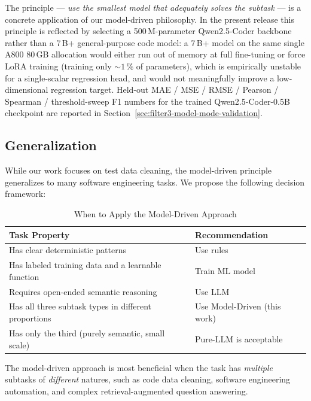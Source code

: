 \documentclass[acmlarge,nonacm,screen]{acmart}
\begin{document}
The principle --- \textit{use the smallest model that adequately
solves the subtask} --- is a concrete application of our
model-driven philosophy. In the present release this principle is
reflected by selecting a 500\,M-parameter Qwen2.5-Coder backbone
rather than a 7\,B+ general-purpose code model: a 7\,B+ model on
the same single A800 80\,GB allocation would either run out of
memory at full fine-tuning or force LoRA training (training only
$\sim 1\,\%$ of parameters), which is empirically unstable for a
single-scalar regression head, and would not meaningfully improve
a low-dimensional regression target. Held-out MAE / MSE / RMSE /
Pearson / Spearman / threshold-sweep F1 numbers for the trained
Qwen2.5-Coder-0.5B checkpoint are reported in
Section~\ref{sec:filter3-model-mode-validation}.

\subsection{Generalization}

While our work focuses on test data cleaning, the model-driven principle generalizes to many software engineering tasks. We propose the following decision framework:

\begin{table}[htbp]
\caption{When to Apply the Model-Driven Approach}
\label{tab:when-md}
\begin{tabular}{@{}p{8cm}l@{}}
\toprule
\textbf{Task Property} & \textbf{Recommendation} \\
\midrule
Has clear deterministic patterns & Use rules \\
Has labeled training data and a learnable function & Train ML model \\
Requires open-ended semantic reasoning & Use LLM \\
Has all three subtask types in different proportions & Use Model-Driven (this work) \\
Has only the third (purely semantic, small scale) & Pure-LLM is acceptable \\
\bottomrule
\end{tabular}
\end{table}

The model-driven approach is most beneficial when the task has \textit{multiple} subtasks of \textit{different} natures, such as code data cleaning, software engineering automation, and complex retrieval-augmented question answering.


\end{document}
